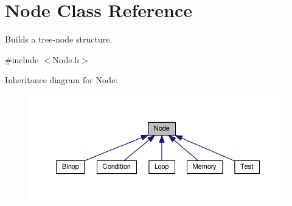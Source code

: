 \hypertarget{classNode}{}\section{Node Class Reference}
\label{classNode}


Builds a tree-\/node structure.  




{\ttfamily \#include $<$Node.\+h$>$}



Inheritance diagram for Node\+:
\nopagebreak
\begin{figure}[H]
\begin{center}
\leavevmode
\includegraphics[width=350pt]{classNode__inherit__graph}
\end{center}
\end{figure}
